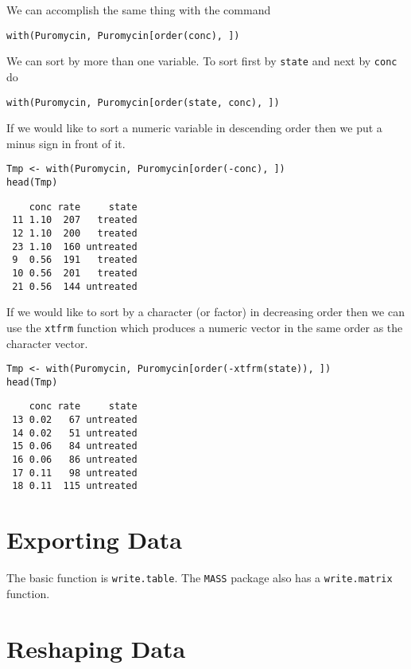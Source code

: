 \documentclass[captions=tableheading]{scrbook}
\begin{document}
We can accomplish the same thing with the command 


\begin{verbatim}
with(Puromycin, Puromycin[order(conc), ])
\end{verbatim}

We can sort by more than one variable. To sort first by \texttt{state} and next by \texttt{conc} do 


\begin{verbatim}
with(Puromycin, Puromycin[order(state, conc), ])
\end{verbatim}

If we would like to sort a numeric variable in descending order then we put a minus sign in front of it. 


\begin{verbatim}
Tmp <- with(Puromycin, Puromycin[order(-conc), ])
head(Tmp)
\end{verbatim}

\begin{verbatim}
    conc rate     state
 11 1.10  207   treated
 12 1.10  200   treated
 23 1.10  160 untreated
 9  0.56  191   treated
 10 0.56  201   treated
 21 0.56  144 untreated
\end{verbatim}

If we would like to sort by a character (or factor) in decreasing order then we can use the \texttt{xtfrm} function which produces a numeric vector in the same order as the character vector.


\begin{verbatim}
Tmp <- with(Puromycin, Puromycin[order(-xtfrm(state)), ])
head(Tmp)
\end{verbatim}

\begin{verbatim}
    conc rate     state
 13 0.02   67 untreated
 14 0.02   51 untreated
 15 0.06   84 untreated
 16 0.06   86 untreated
 17 0.11   98 untreated
 18 0.11  115 untreated
\end{verbatim}
\section{Exporting Data \label{sec:Exporting-a-Data}}
\label{sec-5-5}


The basic function is \texttt{write.table}. The \texttt{MASS} package also has a \texttt{write.matrix} function.
\section{Reshaping Data \label{sec:Reshaping-a-Data}}
\label{sec-5-6}
\end{document}
